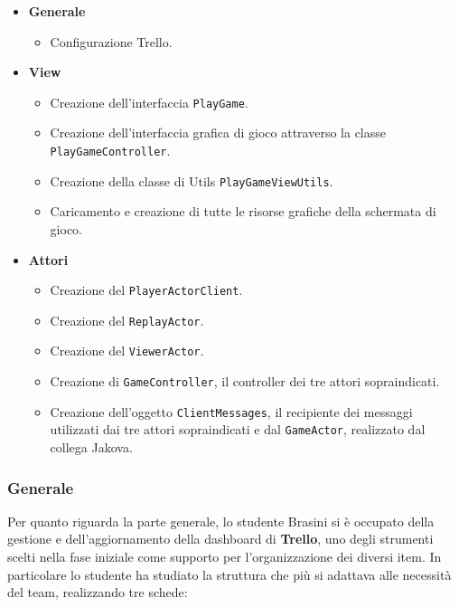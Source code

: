         \begin{itemize}
        \item \textbf{Generale}
        		\begin {itemize} 
		\item Configurazione Trello.
     	\end {itemize}
     
     	\item \textbf{View}
		\begin {itemize}
		\item Creazione dell'interfaccia \texttt{PlayGame}.
		\item Creazione dell'interfaccia grafica di gioco attraverso la classe \texttt{PlayGameController}.
		\item Creazione della classe di Utils \texttt{PlayGameViewUtils}. 	
		\item Caricamento e creazione di tutte le risorse grafiche della schermata di gioco.
	\end {itemize}
	
	\item \textbf{Attori}
		\begin {itemize}
		\item Creazione del \texttt{PlayerActorClient}. 
		\item Creazione del \texttt{ReplayActor}.
		\item Creazione del \texttt{ViewerActor}.
		\item Creazione di \texttt{GameController}, il controller dei tre attori sopraindicati.
		\item Creazione dell'oggetto \texttt{ClientMessages}, il recipiente dei messaggi utilizzati dai tre attori sopraindicati e dal \texttt{GameActor}, realizzato dal collega Jakova.
		\end{itemize}
		
     \end {itemize}
     
     \clearpage
     
     \subsubsection{Generale}\label{subsub:brasini:general}
     Per quanto riguarda la parte generale, lo studente Brasini si è occupato della gestione e dell'aggiornamento della dashboard di \textbf{Trello}, uno degli strumenti scelti nella fase iniziale come supporto per l'organizzazione dei diversi item. In particolare lo studente ha studiato la struttura che più si adattava alle necessità del team, realizzando tre schede:
     
